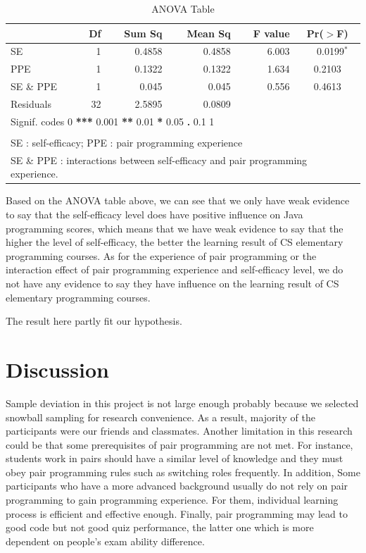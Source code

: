 \documentclass{sigchi}
\begin{document}
\begin{table}[ht]
\begin{center}
\caption{ANOVA Table}
\label{table1}
\begin{tabular}{lrrrrc}
  \hline
 & Df & Sum Sq & Mean Sq & F value & Pr($>$F) \\ 
  \hline
SE      &1	&0.4858	&0.4858	 &6.003	  &~~0.0199$^*$  \\
PPE         &1	&0.1322	&0.1322	 &1.634	  &0.2103      \\ 
 SE \& PPE          &1	&0.045	&0.045	&0.556	&0.4613  \\
  Residuals  	&32	&2.5895 & 0.0809 &  &  \\ 
   \hline
   \hline
\multicolumn{6}{l}{Signif. codes    0 \textbf{ *** } 0.001 \textbf{ ** } 0.01\textbf{ * } 0.05 \textbf{ . } 0.1 \textbf{   } 1} \\ 
\hline \\
\multicolumn{6}{l}{\small SE : self-efficacy; PPE :  pair programming experience} \\
\multicolumn{6}{l}{\small SE \& PPE  : interactions between self-efficacy and pair programming experience.}
\end{tabular}
\end{center}
\end{table}

Based on the ANOVA table above, we can see that we only have weak evidence to say that the self-efficacy level does have positive influence on Java programming scores, which means that we have weak evidence to say that the higher the level of self-efficacy, the better the learning result of CS elementary programming courses. As for the experience of pair programming or the interaction effect of pair programming experience and self-efficacy level, we do not have any evidence to say they have influence on the learning result of CS elementary programming courses.

The result here partly fit our hypothesis. 


\section{Discussion}

Sample deviation in this project is not large enough probably because we selected snowball sampling for research convenience. As a result, majority of the participants were our friends and classmates. Another limitation in this research could be that some prerequisites of pair programming are not met.  For instance, students work in pairs should have a similar level of knowledge and they must obey pair programming rules such as switching roles frequently. In addition, Some participants who have a more advanced background usually do not rely on pair programming to gain programming experience. For them,  individual learning process is efficient and effective enough. Finally, pair programming may lead to good code but not good quiz performance, the latter one which is more dependent on people's exam ability difference.
\end{document}
